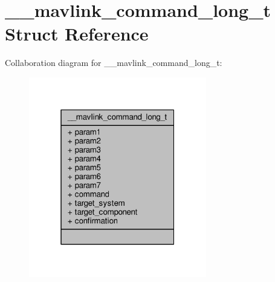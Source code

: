 \hypertarget{struct____mavlink__command__long__t}{\section{\+\_\+\+\_\+mavlink\+\_\+command\+\_\+long\+\_\+t Struct Reference}
\label{struct____mavlink__command__long__t}
}


Collaboration diagram for \+\_\+\+\_\+mavlink\+\_\+command\+\_\+long\+\_\+t\+:
\nopagebreak
\begin{figure}[H]
\begin{center}
\leavevmode
\includegraphics[width=220pt]{struct____mavlink__command__long__t__coll__graph}
\end{center}
\end{figure}
